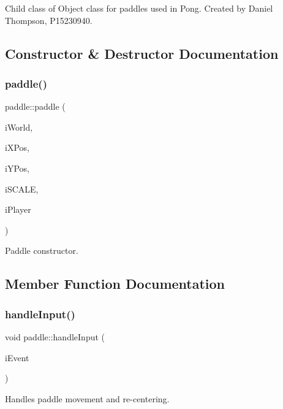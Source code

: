 Child class of Object class for paddles used in Pong. Created by Daniel Thompson, P15230940. 

\subsection{Constructor \& Destructor Documentation}
\mbox{\label{classpaddle_a49204236762e7810824271d3c7c793c5}} 
\subsubsection{\texorpdfstring{paddle()}{paddle()}}
{\footnotesize\ttfamily paddle\+::paddle (\begin{DoxyParamCaption}\item[{b2\+World \&}]{i\+World,  }\item[{float}]{i\+X\+Pos,  }\item[{float}]{i\+Y\+Pos,  }\item[{double}]{i\+S\+C\+A\+LE,  }\item[{int}]{i\+Player }\end{DoxyParamCaption})}



Paddle constructor. 



\subsection{Member Function Documentation}
\mbox{\label{classpaddle_ac20b5583e5d21b34dd831f0289aae244}} 
\subsubsection{\texorpdfstring{handle\+Input()}{handleInput()}}
{\footnotesize\ttfamily void paddle\+::handle\+Input (\begin{DoxyParamCaption}\item[{sf\+::\+Event \&}]{i\+Event }\end{DoxyParamCaption})}



Handles paddle movement and re-\/centering. 

\mbox{\label{classpaddle_ae20fb7dc01d0a3b92ebc49e5d132aee8}} 
